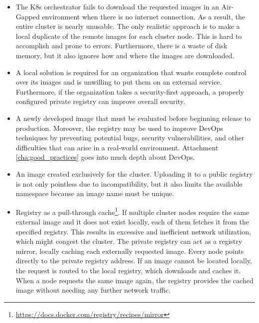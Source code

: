 \begin{itemize}
  \item The K8s orchestrator fails to download the requested images in an Air-Gapped
    environment when there is no internet connection. As a result, the entire cluster
    is nearly unusable. The only realistic approach is to make a local duplicate
    of the remote images for each cluster node. This is hard to accomplish and prone
    to errors. Furthermore, there is a waste of disk memory, but it also ignores
    how and where the images are downloaded.

  \item A local solution is required for an organization that wants complete control
    over its images and is unwilling to put them on an external service.
    Furthermore, if the organization takes a security-first approach, a properly
    configured private registry can improve overall security.

  \item A newly developed image that must be evaluated before beginning release to
    production. Moreover, the registry may be used to improve DevOps techniques by
    preventing potential bugs, security vulnerabilities, and other difficulties that
    can arise in a real-world environment. Attachment \ref{cha:good_practices}
    goes into much depth about DevOps.

  \item An image created exclusively for the cluster. Uploading it to a public
    registry is not only pointless due to incompatibility, but it also limits the
    available namespace because an image name must be unique.

  \item Registry as a pull-through cache\footnote{\url{https://docs.docker.com/registry/recipes/mirror}}.
    If multiple cluster nodes require the same external image and it does not
    exist locally, each of them fetches it from the specified registry. This
    results in excessive and inefficient network utilization, which might congest
    the cluster. The private registry can act as a registry mirror, locally caching
    each externally requested image. Every node points directly to the private
    registry address. If an image cannot be located locally, the request is
    routed to the local registry, which downloads and caches it. When a node
    requests the same image again, the registry provides the cached image without
    needing any further network traffic.
\end{itemize}

